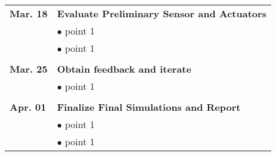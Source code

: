 \documentclass[12pt]{article}
\begin{document}
{\begin{tabular}{l | l}
\textbf{Mar. 18} & \textbf{Evaluate Preliminary Sensor and Actuators}\\
 & $\bullet$ point 1\\
  & $\bullet$ point 1\\\\
\textbf{Mar. 25} & \textbf{Obtain feedback and iterate}\\
  & $\bullet$ point 1\\\\
\textbf{Apr. 01} & \textbf{Finalize Final Simulations and Report}\\
 & $\bullet$ point 1\\
  & $\bullet$ point 1\\


\end{tabular}
}
\end{document}
